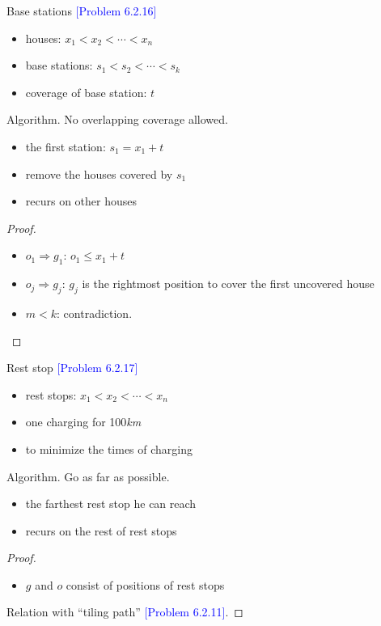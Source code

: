 \documentclass{beamer}
\newcommand{\problemno}[1]{\textcolor{blue}{\scriptsize [Problem #1]}}
\begin{document}
\begin{frame}{}
  \begin{block}{Base stations \problemno{6.2.16}}
    \begin{itemize}
      \item houses: $x_1 < x_2 < \cdots < x_n$
      \item base stations: $s_1 < s_2 < \cdots < s_k$
      \item coverage of base station: $t$
    \end{itemize}
  \end{block}

  \begin{block}{Algorithm.}
	No overlapping coverage allowed.
    \begin{itemize}
      \item the first station: $s_1 = x_1 + t$
      \item remove the houses covered by $s_1$
      \item recurs on other houses
    \end{itemize}
  \end{block}

  \begin{proof}
	\begin{itemize}
	  \item $o_1 \Rightarrow g_1$: $o_1 \le x_1 + t$
	  \item $o_j \Rightarrow g_j$: $g_j$ is the rightmost position to cover the
	  first uncovered house
	  \item $m < k$: contradiction.
	\end{itemize}
  \end{proof}
\end{frame}
\begin{frame}{}
  \begin{block}{Rest stop \problemno{6.2.17}}
    \begin{itemize}
      \item rest stops: $x_1 < x_2 < \cdots < x_n$
      \item one charging for 100\emph{km}
      \item to minimize the times of charging
    \end{itemize}
  \end{block}

  \begin{block}{Algorithm.}
    Go as far as possible.
    \begin{itemize}
      \item the farthest rest stop he can reach
      \item recurs on the rest of rest stops
    \end{itemize}
  \end{block}

  \begin{proof}
    \begin{itemize}
      \item $g$ and $o$ consist of positions of rest stops
    \end{itemize}
    Relation with ``tiling path'' \problemno{6.2.11}.
  \end{proof}
\end{frame}
\end{document}
